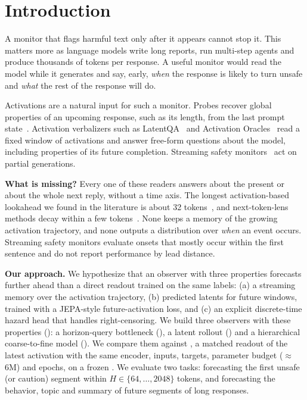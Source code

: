 \section{Introduction}
\label{sec:intro}

A monitor that flags harmful text only after it appears cannot stop it.
This matters more as language models write long reports, run multi-step agents and produce thousands of tokens per response.
A useful monitor would read the model while it generates and say, early, \emph{when} the response is likely to turn unsafe and \emph{what} the rest of the response will do.

Activations are a natural input for such a monitor.
Probes recover global properties of an upcoming response, such as its length, from the last prompt state~\citep{dong2025emergent}.
Activation verbalizers such as LatentQA~\citep{pan2024latentqa} and Activation Oracles~\citep{karvonen2025activation} read a fixed window of activations and answer free-form questions about the model, including properties of its future completion.
Streaming safety monitors~\citep{li2025scm,stream2026guard,qwen2025guard} act on partial generations.

{\bf What is missing?}
Every one of these readers answers about the present or about the whole next reply, without a time axis.
The longest activation-based lookahead we found in the literature is about 32 tokens~\citep{egtp2026}, and next-token-lens methods decay within a few tokens~\citep{pal2023futurelens}.
None keeps a memory of the growing activation trajectory, and none outputs a distribution over \emph{when} an event occurs.
Streaming safety monitors evaluate onsets that mostly occur within the first sentence and do not report performance by lead distance.

{\bf Our approach.}
We hypothesize that an observer with three properties forecasts further ahead than a direct readout trained on the same labels: (a) a streaming memory over the activation trajectory, (b) predicted latents for future windows, trained with a JEPA-style future-activation loss, and (c) an explicit discrete-time hazard head that handles right-censoring.
We build three observers with these properties (): a horizon-query bottleneck (\hq), a latent rollout (\roll) and a hierarchical coarse-to-fine model (\hier).
We compare them against \directao, a matched readout of the latest activation with the same encoder, inputs, targets, parameter budget ($\approx$6M) and epochs, on a frozen \qwen.
We evaluate two tasks: forecasting the first unsafe (or caution) segment within $H \in \{64,\dots,2048\}$ tokens, and forecasting the behavior, topic and summary of future segments of long responses.

